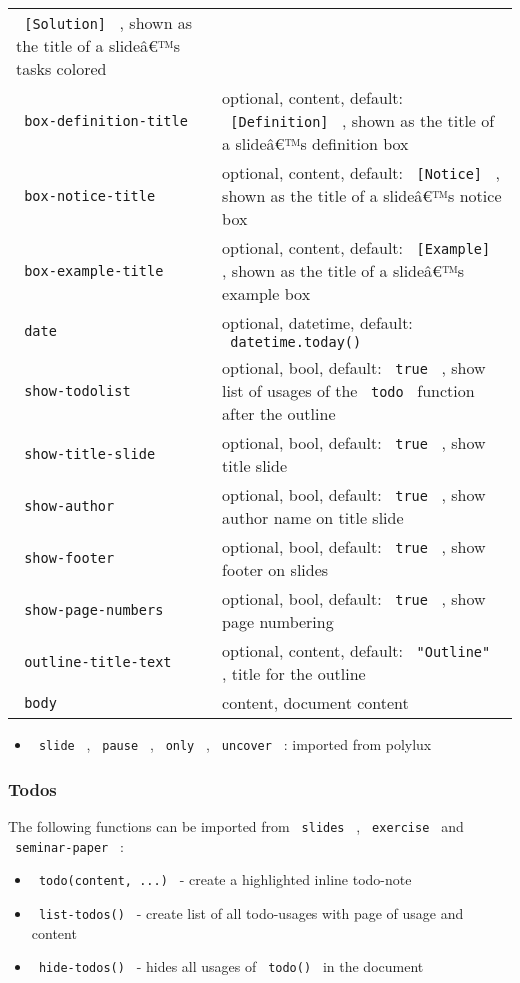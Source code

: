\begin{longtable}[]{@{}ll@{}}
\texttt{\ {[}Solution{]}\ } , shown as the title of a slideâ€™s tasks
colored \\
\texttt{\ box-definition-title\ } & optional, content, default:
\texttt{\ {[}Definition{]}\ } , shown as the title of a slideâ€™s
definition box \\
\texttt{\ box-notice-title\ } & optional, content, default:
\texttt{\ {[}Notice{]}\ } , shown as the title of a slideâ€™s notice
box \\
\texttt{\ box-example-title\ } & optional, content, default:
\texttt{\ {[}Example{]}\ } , shown as the title of a slideâ€™s example
box \\
\texttt{\ date\ } & optional, datetime, default:
\texttt{\ datetime.today()\ } \\
\texttt{\ show-todolist\ } & optional, bool, default: \texttt{\ true\ }
, show list of usages of the \texttt{\ todo\ } function after the
outline \\
\texttt{\ show-title-slide\ } & optional, bool, default:
\texttt{\ true\ } , show title slide \\
\texttt{\ show-author\ } & optional, bool, default: \texttt{\ true\ } ,
show author name on title slide \\
\texttt{\ show-footer\ } & optional, bool, default: \texttt{\ true\ } ,
show footer on slides \\
\texttt{\ show-page-numbers\ } & optional, bool, default:
\texttt{\ true\ } , show page numbering \\
\texttt{\ outline-title-text\ } & optional, content, default:
\texttt{\ "Outline"\ } , title for the outline \\
\texttt{\ body\ } & content, document content \\
\end{longtable}

\begin{itemize}
\tightlist
\item
  \texttt{\ slide\ } , \texttt{\ pause\ } , \texttt{\ only\ } ,
  \texttt{\ uncover\ } : imported from polylux
\end{itemize}

\subsubsection{Todos}\label{todos}

The following functions can be imported from \texttt{\ slides\ } ,
\texttt{\ exercise\ } and \texttt{\ seminar-paper\ } :

\begin{itemize}
\tightlist
\item
  \texttt{\ todo(content,\ ...)\ } - create a highlighted inline
  todo-note
\item
  \texttt{\ list-todos()\ } - create list of all todo-usages with page
  of usage and content
\item
  \texttt{\ hide-todos()\ } - hides all usages of \texttt{\ todo()\ } in
  the document
\end{itemize}

